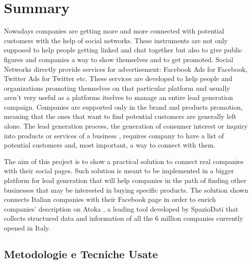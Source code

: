 \chapter*{Summary} %
\label{Summary}




Nowadays companies are getting more and more connected with potential customers with the help of social networks. These instruments are not only supposed to help people getting linked and chat together but also to give public figures and companies a way to show themselves and to get promoted. Social Networks directly provide services for advertisement: Facebook Ads for Facebook, Twitter Ads for Twitter etc. These services are developed to help people and organizations promoting themselves on that particular platform and usually aren't very useful as a platforms itselves to manage an entire lead generation campaign. Companies are supported only in the brand and products promotion, meaning that the ones that want to find potential customers are generally left alone. The lead generation process, the generation of consumer interest or inquiry into products or services of a business
, requires company to have a list of potential customers and, most important, a way to connect with them.

The aim of this project is to show a practical solution to connect real companies with their social pages.
Such solution is meant to be implemented in a bigger platform for lead generation that will help companies in the path of finding other businesses that may be interested in buying specific products. 
The solution shown connects Italian companies with their Facebook page in order to enrich companies' description on Atoka
, a leading tool developed by SpazioDati
 that collects structured data and information of all the 6 million companies currently opened in Italy.

\section{Metodologie e Tecniche Usate}
